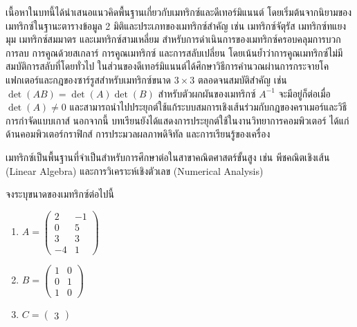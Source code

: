 เนื้อหาในบทนี้ได้นำเสนอแนวคิดพื้นฐานเกี่ยวกับเมทริกซ์และดีเทอร์มิแนนต์ โดยเริ่มต้นจากนิยามของเมทริกซ์ในฐานะตารางข้อมูล 2 มิติและประเภทของเมทริกซ์สำคัญ เช่น เมทริกซ์จัตุรัส เมทริกซ์ทแยงมุม เมทริกซ์สมมาตร และเมทริกซ์สามเหลี่ยม สำหรับการดำเนินการของเมทริกซ์ครอบคลุมการบวก การลบ การคูณด้วยสเกลาร์ การคูณเมทริกซ์ และการสลับเปลี่ยน โดยเน้นย้ำว่าการคูณเมทริกซ์ไม่มีสมบัติการสลับที่โดยทั่วไป ในส่วนของดีเทอร์มิแนนต์ได้ศึกษาวิธีการคำนวณผ่านการกระจายโคแฟกเตอร์และกฎของซาร์รูสสำหรับเมทริกซ์ขนาด $3 \times 3$ ตลอดจนสมบัติสำคัญ เช่น $\det(AB) = \det(A)\det(B)$ สำหรับตัวผกผันของเมทริกซ์ $A^{-1}$ จะมีอยู่ก็ต่อเมื่อ $\det(A) \neq 0$ และสามารถนำไปประยุกต์ใช้แก้ระบบสมการเชิงเส้นร่วมกับกฎของคราเมอร์และวิธีการกำจัดแบบเกาส์ นอกจากนี้ บทเรียนยังได้แสดงการประยุกต์ใช้ในงานวิทยาการคอมพิวเตอร์ ได้แก่ ด้านคอมพิวเตอร์กราฟิกส์ การประมวลผลภาพดิจิทัล และการเรียนรู้ของเครื่อง

เมทริกซ์เป็นพื้นฐานที่จำเป็นสำหรับการศึกษาต่อในสาขาคณิตศาสตร์ขั้นสูง เช่น พีชคณิตเชิงเส้น (Linear Algebra) และการวิเคราะห์เชิงตัวเลข (Numerical Analysis)~\parencite{strang2023linear}

\clearpage
{}
\begin{exercise}
จงระบุขนาดของเมทริกซ์ต่อไปนี้
\begin{enumerate}
    \item $A = \begin{pmatrix} 2 & -1 \\ 0 & 5 \\ 3 & 3 \\ -4 & 1 \end{pmatrix}$
    \item $B = \begin{pmatrix} 1 & 0 \\ 0 & 1 \\ 1 & 0 \end{pmatrix}$
    \item $C = \begin{pmatrix} 3 \end{pmatrix}$
\end{enumerate}
\end{exercise}

